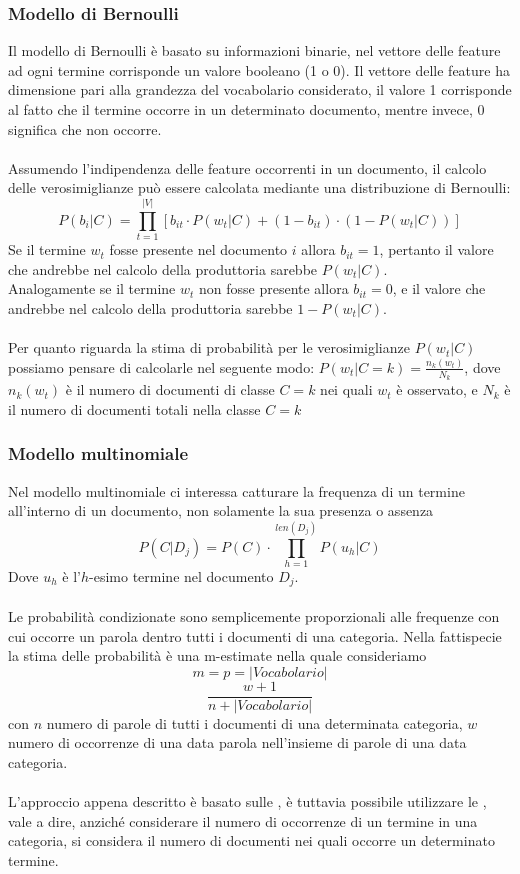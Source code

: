\documentclass{article}
\theoremstyle{plain}
\theoremstyle{definition}
\begin{document}
\subsubsection{Modello di Bernoulli}
Il modello di Bernoulli è basato su informazioni binarie, nel vettore delle feature ad ogni termine corrisponde un valore booleano (1 o 0). Il vettore delle feature ha dimensione pari alla grandezza del vocabolario considerato, il valore 1 corrisponde al fatto che il termine occorre in un determinato documento, mentre invece, 0 significa che non occorre.
\\
\\
Assumendo l'indipendenza delle feature occorrenti in un documento, il calcolo delle verosimiglianze può essere calcolata mediante una distribuzione di Bernoulli:
$$P(b_{i}|C)=\prod_{t=1}^{|V|}[ b_{it}\cdot P(w_t | C) +  (1-b_{it})\cdot(1-P(w_t | C))]$$
Se il termine $w_{t}$ fosse presente nel documento $i$ allora $b_{it}=1$, pertanto il valore che andrebbe nel calcolo della produttoria sarebbe $P(w_t | C)$.
\\
Analogamente se il termine $w_{t}$ non fosse presente allora $b_{it}=0$, e il valore che andrebbe nel calcolo della produttoria sarebbe $1-P(w_t | C)$.
\\
\\
Per quanto riguarda la stima di probabilità per le verosimiglianze $P(w_t | C)$ possiamo pensare di calcolarle nel seguente modo: $P(w_t | C=k)=\frac{n_k(w_t)}{N_k}$, dove $n_k(w_t)$ è il numero di documenti di classe $C=k$ nei quali $w_t$ è osservato, e $N_k$ è il numero di documenti totali nella classe $C=k$
\footnotemark
{}
\subsubsection{Modello multinomiale}
Nel modello multinomiale ci interessa catturare la frequenza di un termine all'interno di un documento, non solamente la sua presenza o assenza
$$P(C|D_j)= P(C)\cdot \prod_{h=1}^{len(D_{j})} P(u_h|C)$$
Dove $u_h$ è l'$h$-esimo termine nel documento $D_j$.
\\
\\
Le probabilità condizionate sono semplicemente proporzionali alle frequenze con cui occorre un parola dentro tutti i documenti di una categoria.
Nella fattispecie la stima delle probabilità è una m-estimate nella quale consideriamo $$m=p=|Vocabolario|$$
$$\frac{w+1}{n+|Vocabolario|}$$
con $n$ numero di parole di tutti i documenti di una determinata categoria, $w$ numero di occorrenze di una data parola nell'insieme di parole di una data categoria.
\\
\\
L'approccio appena descritto è basato sulle , è tuttavia possibile utilizzare le , vale a dire, anziché considerare il numero di occorrenze di un termine in una categoria, si considera il numero di documenti nei quali occorre un determinato termine.
\end{document}
